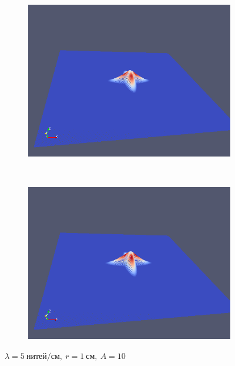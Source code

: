 \begin{figure}[H]
\begin{subfigure}[t]{0.5\textwidth}
        \includegraphics[width=\textwidth]{img/fiber/density_5_radius_1_amplitude_10/5.png}
    \end{subfigure}%
    ~
    \begin{subfigure}[t]{0.5\textwidth}
        \centering
        \includegraphics[width=\textwidth]{img/fiber/density_5_radius_1_amplitude_10/6.png}
    \end{subfigure}
    \caption{$\lambda=5~нитей/см,~r=1~см,~A=10$}
\end{figure}

